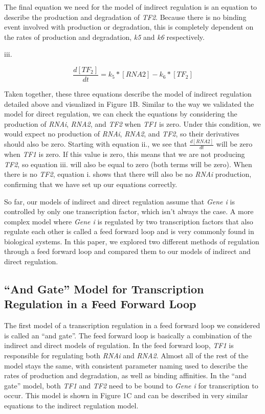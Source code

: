 \documentclass{article}
\begin{document}
The final equation we need for the model of indirect regulation is an equation to describe the production and degradation of \textit{TF2}. Because there is no binding event involved with production or degradation, this is completely dependent on the rates of production and degradation, \textit{k5} and \textit{k6} respectively.

iii. 

\[
\frac{d[TF_2]}{dt} = k_5 * [RNA2] - k_6 * [TF_2]
\]

Taken together, these three equations describe the model of indirect regulation detailed above and visualized in Figure 1B. Similar to the way we validated the model for direct regulation, we can check the equations by considering the production of \textit{RNAi}, \textit{RNA2}, and \textit{TF2} when \textit{TF1} is zero. Under this condition, we would expect no production of \textit{RNAi}, \textit{RNA2}, and \textit{TF2}, so their derivatives should also be zero. Starting with equation ii., we see that \(\frac{d[RNA2]}{dt}\) will be zero when \textit{TF1} is zero. If this value is zero, this means that we are not producing \textit{TF2}, so equation iii. will also be equal to zero (both terms will be zero). When there is no \textit{TF2}, equation i. shows that there will also be no \textit{RNAi} production, confirming that we have set up our equations correctly. 

So far, our models of indirect and direct regulation assume that \textit{Gene i} is controlled by only one transcription factor, which isn't always the case. A more complex model where \textit{Gene i} is regulated by two transcription factors that also regulate each other is called a feed forward loop and is very commonly found in biological systems. In this paper, we explored two different methods of regulation through a feed forward loop and compared them to our models of indirect and direct regulation. 

\subsection{``And Gate'' Model for Transcription Regulation in a Feed Forward Loop}

The first model of a transcription regulation in a feed forward loop we considered is called an ``and gate''. The feed forward loop is basically a combination of the indirect and direct models of regulation. In the feed forward loop, \textit{TF1} is responsible for regulating both \textit{RNAi} and \textit{RNA2}. Almost all of the rest of the model stays the same, with consistent parameter naming used to describe the rates of production and degradation, as well as binding affinities. In the ``and gate'' model, both \textit{TF1} and \textit{TF2} need to be bound to \textit{Gene i} for transcription to occur. This model is shown in Figure 1C and can be described in very similar equations to the indirect regulation model. 
\end{document}
